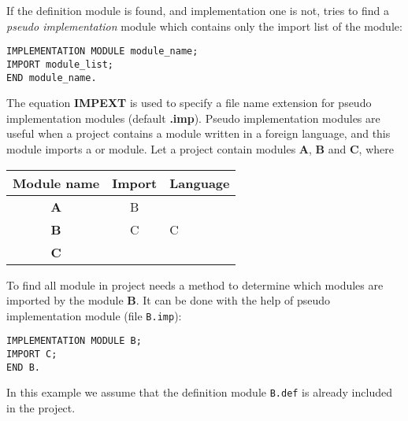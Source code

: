 If the definition module is found, and implementation one is not, \xds{}
tries to find a {\em pseudo implementation} module
which contains only the import list of the module:
\begin{verbatim}
IMPLEMENTATION MODULE module_name;
IMPORT module_list;
END module_name.
\end{verbatim}

The equation {\bf IMPEXT} is used to specify a file name extension
for pseudo implementation modules (default {\bf .imp}).
Pseudo implementation modules are useful
when a project contains a module written in a foreign language,
and this module imports a \mt{} or \ot{} module.
Let a project contain modules {\bf A}, {\bf B} and {\bf C},
where
        \begin{center}
        \begin{tabular}{|c|c|l|} \hline
        \bf Module name & Import  & Language \\ \hline
        \bf A           & B       & \mt{}    \\ \hline
        \bf B           & C       & C        \\ \hline
        \bf C           &         & \mt{}    \\ \hline
        \end{tabular}
        \end{center}
To find all module in project \xds{}
needs a method to determine which modules are imported by
the module {\bf B}. It can be done with the help of pseudo
implementation module (file {\tt B.imp}):
\begin{verbatim}
IMPLEMENTATION MODULE B;
IMPORT C;
END B.
\end{verbatim}
In this example we assume that the definition module {\tt B.def}
is already included in the project.
